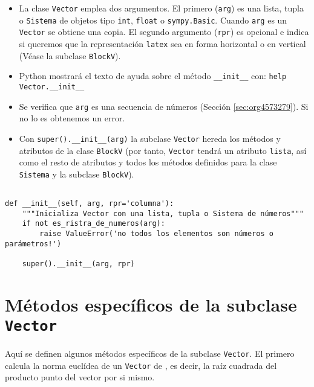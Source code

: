 \documentclass[11pt]{report}
\begin{document}
\begin{itemize}
\item La clase \texttt{Vector} emplea dos argumentos. El primero (\texttt{arg}) es una
lista, tupla o \texttt{Sistema} de objetos tipo \texttt{int}, \texttt{float} o
\texttt{sympy.Basic}. Cuando \texttt{arg} es un \texttt{Vector} se obtiene una copia. El
segundo argumento (\texttt{rpr}) es opcional e indica si queremos que la
representación \texttt{latex} sea en forma horizontal o en vertical (Véase
la subclase \texttt{BlockV}).

\item Python mostrará el texto de ayuda sobre el método \texttt{\_\_init\_\_} con:
\texttt{help Vector.\_\_init\_\_}

\item Se verifica que \texttt{arg} es una secuencia de números (Sección
\ref{sec:org4573279}). Si no lo es obtenemos un error.

\item Con \texttt{super().\_\_init\_\_(arg)} la subclase \texttt{Vector} hereda los métodos
y atributos de la clase \texttt{BlockV} (por tanto, \texttt{Vector} tendrá un
atributo \texttt{lista}, así como el resto de atributos y todos los métodos
definidos para la clase \texttt{Sistema} y la subclase \texttt{BlockV}).
\end{itemize}


\begin{verbatim}

def __init__(self, arg, rpr='columna'):
    """Inicializa Vector con una lista, tupla o Sistema de números"""                       
    if not es_ristra_de_numeros(arg):
        raise ValueError('no todos los elementos son números o parámetros!')

    super().__init__(arg, rpr)

\end{verbatim}

\section{Métodos específicos de la subclase \texttt{Vector}}
\label{sec:orgde78ee8}

Aquí se definen algunos métodos específicos de la subclase
\texttt{Vector}. El primero calcula la norma euclídea de un \texttt{Vector} de
\R[n], es decir, la raíz cuadrada del producto punto del vector por si
mismo.
\end{document}
